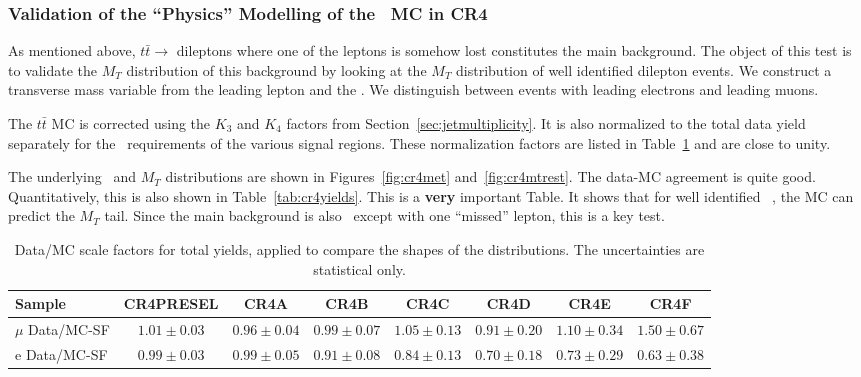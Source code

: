 \subsubsection{Validation of the ``Physics'' Modelling of the \ttdl\
  MC in CR4}
\label{sec:CR4-valid}

As mentioned above, $t\bar{t} \to $ dileptons where one of the leptons
is somehow lost constitutes the main background.
The object of this test is to validate the $M_T$ distribution of this
background by looking at the $M_T$ distribution of well identified
dilepton events.
We construct a transverse mass variable from the leading lepton and
the \met.  We distinguish between events with leading electrons and
leading muons.  

The $t\bar{t}$ MC is corrected using the $K_3$ and $K_4$ factors
from Section~\ref{sec:jetmultiplicity}.  It is also normalized to the 
total data yield separately for the \met\ requirements of the various signal
regions.  These normalization factors are listed
in Table~\ref{tab:cr4mtsf} and are close to unity.

The underlying \met\ and $M_T$ distributions are shown in 
Figures~\ref{fig:cr4met} and~\ref{fig:cr4mtrest}.  The data-MC agreement
is quite good.  Quantitatively, this is also shown in Table~\ref{tab:cr4yields}.
This is a {\bf very} important Table.  It shows that for well
identified \ttdl\ , the MC can predict the $M_T$ tail.  Since the
main background is also \ttdl\ except with one ``missed'' lepton, 
this is a key test.

\begin{table}[!h]
\begin{center}
{\footnotesize
\begin{tabular}{l||c||c|c|c|c|c|c}
\hline
Sample              & CR4PRESEL & CR4A & CR4B & CR4C &
CR4D & CR4E & CR4F\\
\hline
\hline
$\mu$ Data/MC-SF 	  & $1.01 \pm 0.03$ & $0.96 \pm 0.04$ & $0.99 \pm 0.07$ & $1.05 \pm 0.13$ & $0.91 \pm 0.20$ & $1.10 \pm 0.34$ & $1.50 \pm 0.67$ \\
\hline
\hline
e Data/MC-SF 	  & $0.99 \pm 0.03$ & $0.99 \pm 0.05$ & $0.91 \pm 0.08$ & $0.84 \pm 0.13$ & $0.70 \pm 0.18$ & $0.73 \pm 0.29$ & $0.63 \pm 0.38$ \\
\hline
\end{tabular}}
\caption{ Data/MC scale factors for total yields, applied to compare
  the shapes of the distributions.
  The uncertainties are statistical only.
\label{tab:cr4mtsf}}
\end{center}
\end{table}


